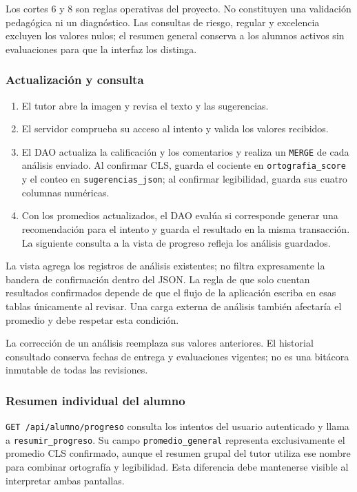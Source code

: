 Los cortes 6 y 8 son reglas operativas del proyecto. No constituyen una validación pedagógica ni un diagnóstico. Las consultas de riesgo, regular y excelencia excluyen los valores nulos; el resumen general conserva a los alumnos activos sin evaluaciones para que la interfaz los distinga.

\subsubsection{Actualización y consulta}
\begin{enumerate}
    \item El tutor abre la imagen y revisa el texto y las sugerencias.
    \item El servidor comprueba su acceso al intento y valida los valores recibidos.
    \item El DAO actualiza la calificación y los comentarios y realiza un \texttt{MERGE} de cada análisis enviado. Al confirmar CLS, guarda el cociente en \texttt{ortografia\_score} y el conteo en \texttt{sugerencias\_json}; al confirmar legibilidad, guarda sus cuatro columnas numéricas.
    \item Con los promedios actualizados, el DAO evalúa si corresponde generar una recomendación para el intento y guarda el resultado en la misma transacción. La siguiente consulta a la vista de progreso refleja los análisis guardados.
\end{enumerate}

La vista agrega los registros de análisis existentes; no filtra expresamente la bandera de confirmación dentro del JSON. La regla de que solo cuentan resultados confirmados depende de que el flujo de la aplicación escriba en esas tablas únicamente al revisar. Una carga externa de análisis también afectaría el promedio y debe respetar esta condición.

La corrección de un análisis reemplaza sus valores anteriores. El historial consultado conserva fechas de entrega y evaluaciones vigentes; no es una bitácora inmutable de todas las revisiones.

\subsubsection{Resumen individual del alumno}
\texttt{GET /api/alumno/progreso} consulta los intentos del usuario autenticado y llama a \texttt{resumir\_progreso}. Su campo \texttt{promedio\_general} representa exclusivamente el promedio CLS confirmado, aunque el resumen grupal del tutor utiliza ese nombre para combinar ortografía y legibilidad. Esta diferencia debe mantenerse visible al interpretar ambas pantallas.

